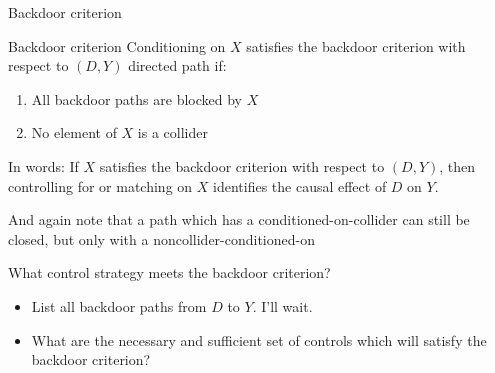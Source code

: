 \documentclass{beamer}
\begin{document}
\begin{frame}{Backdoor criterion}


  \begin{block}{Backdoor criterion}
    Conditioning on $X$ satisfies the backdoor criterion with respect to $(D,Y)$ directed path if:
    \begin{enumerate}
      \item All backdoor paths are blocked by $X$
      \item No element of $X$ is a collider 

    \end{enumerate}

    
  \end{block}
        In words: If $X$ satisfies the backdoor criterion with respect to $(D,Y)$, then controlling for or matching on $X$ identifies the causal effect of $D$ on $Y$. 

\bigskip

    And again note that a path which has a conditioned-on-collider can still be closed, but only with a noncollider-conditioned-on 

\end{frame}

\begin{frame}{What control strategy meets the backdoor criterion?}
  \begin{itemize}
    \item List all backdoor paths from $D$ to $Y$. I'll wait.

          \begin{center}
          \end{center}

    \item What are the necessary and sufficient set of controls which will satisfy the backdoor criterion?
  \end{itemize}

  \framebreak




\end{frame}
\end{document}
